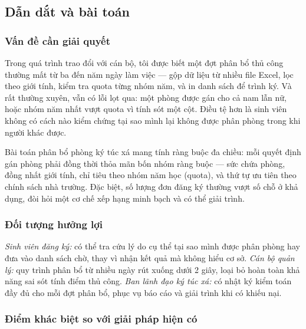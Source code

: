 \documentclass[../DoAn.tex]{subfiles}
\begin{document}
\subsection{Dẫn dắt và bài toán}
\label{subsec:alloc_problem}

\subsubsection{Vấn đề cần giải quyết}

Trong quá trình trao đổi với cán bộ, tôi được biết một đợt phân bổ thủ công
thường mất từ ba đến năm ngày làm việc --- gộp dữ liệu từ nhiều file Excel, lọc
theo giới tính, kiểm tra quota từng nhóm năm, và in danh sách để trình ký. Và
rất thường xuyên, vẫn có lỗi lọt qua: một phòng được gán cho cả nam lẫn nữ,
hoặc nhóm năm nhất vượt quota vì tính sót một cột. Điều tệ hơn là sinh viên
không có cách nào kiểm chứng tại sao mình lại không được phân phòng trong khi
người khác được.

Bài toán phân bổ phòng ký túc xá mang tính ràng buộc đa chiều: mỗi quyết định
gán phòng phải đồng thời thỏa mãn bốn nhóm ràng buộc --- sức chứa phòng, đồng
nhất giới tính, chỉ tiêu theo nhóm năm học (quota), và thứ tự ưu tiên theo
chính sách nhà trường. Đặc biệt, số lượng đơn đăng ký thường vượt số chỗ ở
khả dụng, đòi hỏi một cơ chế xếp hạng minh bạch và có thể giải trình.

\subsubsection{Đối tượng hưởng lợi}

\textit{Sinh viên đăng ký:} có thể tra cứu lý do cụ thể tại sao mình được
phân phòng hay đưa vào danh sách chờ, thay vì nhận kết quả mà không hiểu cơ
sở. \textit{Cán bộ quản lý:} quy trình phân bổ từ nhiều ngày rút xuống dưới
2 giây, loại bỏ hoàn toàn khả năng sai sót tính điểm thủ công. \textit{Ban
lãnh đạo ký túc xá:} có nhật ký kiểm toán đầy đủ cho mỗi đợt phân bổ, phục
vụ báo cáo và giải trình khi có khiếu nại.

\subsubsection{Điểm khác biệt so với giải pháp hiện có}
\end{document}
